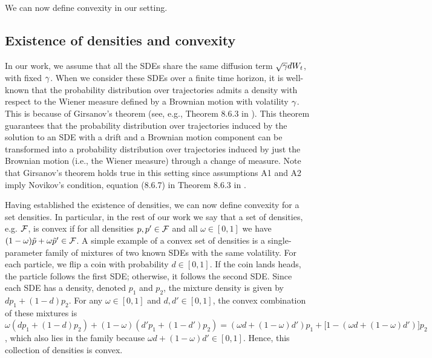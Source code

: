 We can now define convexity in our setting. 

\subsection{Existence of densities and convexity} 
\label{app:convex-densities}
In our work, we assume that all the SDEs share the same diffusion term $\sqrt{\gamma}dW_t$, with fixed $\gamma$. When we consider these SDEs over a finite time horizon, it is well-known that the probability distribution over trajectories admits a density with respect to the Wiener measure defined by a Brownian motion with volatility $\gamma$. This is because of Girsanov's theorem (see, e.g., Theorem 8.6.3 in \citet{oksendal2013stochastic}). This theorem guarantees that the probability distribution over trajectories induced by the solution to an SDE with a drift and a Brownian motion component can be transformed into a probability distribution over trajectories induced by just the Brownian motion (i.e., the Wiener measure) through a change of measure. Note that Girsanov's theorem holds true in this setting since assumptions A1 and A2 imply Novikov's condition, equation (8.6.7) in Theorem 8.6.3 in \citet{oksendal2013stochastic}.

Having established the existence of densities, we can now define convexity for a set densities. In particular, in the rest of our work we say that a set of densities, e.g. $\mathcal{F}$, is convex if for all densities $p,p'\in \mathcal{F}$ and all $\omega\in [0,1]$ we have $(1-\omega)\Tilde{p}+\omega \Tilde{p}'\in \mathcal{F}$. A simple example of a convex set of densities is a single-parameter family of mixtures of two known SDEs with the same volatility. For each particle, we flip a coin with probability $d \in [0,1]$. If the coin lands heads, the particle follows the first SDE; otherwise, it follows the second SDE. Since each SDE has a density, denoted $p_1$ and $p_2$, the mixture density is given by $d p_1 + (1 - d) p_2$. For any $\omega \in [0,1]$ and $d, d' \in [0,1]$, the convex combination of these mixtures is $\omega(d p_1 + (1 - d) p_2) + (1 - \omega)(d' p_1 + (1-d')p_2) = (\omega d + (1 - \omega) d') p_1 + \bigl[1 - (\omega d + (1 - \omega) d')\bigr] p_2$, which also lies in the family because $\omega d + (1 - \omega) d' \in [0,1]$. Hence, this collection of densities is convex.

